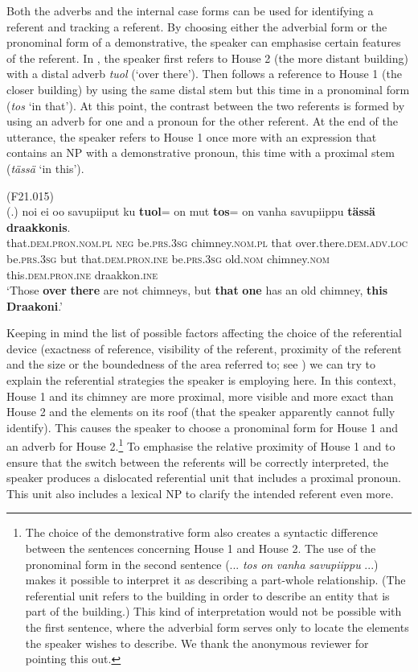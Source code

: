 \documentclass[output=paper,colorlinks,citecolor=brown]{langscibook}
\begin{document}
Both the adverbs and the internal case forms can be used for identifying a referent and tracking a referent. By choosing either the adverbial form or the pronominal form of a demonstrative, the speaker can emphasise certain features of the referent. In , the speaker first refers to House 2 (the more distant building) with a distal adverb \textit{tuol} (‘over there’). Then follows a reference to House 1 (the closer building) by using the same distal stem but this time in a pronominal form (\textit{tos} ‘in that’). At this point, the contrast between the two referents is formed by using an adverb for one and a pronoun for the other referent. At the end of the utterance, the speaker refers to House 1 once more with an expression that contains an NP with a demonstrative pronoun, this time with a proximal stem (\textit{tässä} ‘in this’).

\ea\label{ex:nahkola:14} (F21.015)\\
\gll (.) noi ei oo savupiiput ku \textbf{tuol}= on mut \textbf{tos}= on vanha savupiippu \textbf{tässä} \textbf{draakkonis}.\\
     {} that.\textsc{dem.pron.nom.pl} \textsc{neg} be.\textsc{prs.3sg} chimney.\textsc{nom.pl} that over.there.\textsc{dem.adv.loc} be.\textsc{prs.3sg} but that.\textsc{dem.pron.ine} be.\textsc{prs.3sg} old.\textsc{nom} chimney.\textsc{nom} this.\textsc{dem.pron.ine} draakkon.\textsc{ine}\\
\glt ‘Those \textbf{over} \textbf{there} are not chimneys, but \textbf{that} \textbf{one} has an old chimney, \textbf{this} \textbf{Draakoni}.’ 
\z

Keeping in mind the list of possible factors affecting the choice of the referential device (exactness of reference, visibility of the referent, proximity of the referent and the size or the boundedness of the area referred to; see ) we can try to explain the referential strategies the speaker is employing here. In this context, House 1 and its chimney are more proximal, more visible and more exact than House 2 and the elements on its roof (that the speaker apparently cannot fully identify). This causes the speaker to choose a pronominal form for House 1 and an adverb for House 2.\footnote{The choice of the demonstrative form also creates a syntactic difference between the sentences concerning House 1 and House 2. The use of the pronominal form in the second sentence (... \textit{tos} \textit{on} \textit{vanha} \textit{savupiippu} ...) makes it possible to interpret it as describing a part-whole relationship. (The referential unit refers to the building in order to describe an entity that is part of the building.) This kind of interpretation would not be possible with the first sentence, where the adverbial form serves only to locate the elements the speaker wishes to describe. We thank the anonymous reviewer for pointing this out.} To emphasise the relative proximity of House 1 and to ensure that the switch between the referents will be correctly interpreted, the speaker produces a dislocated referential unit that includes a proximal pronoun. This unit also includes a lexical NP to clarify the intended referent even more.
\end{document}
